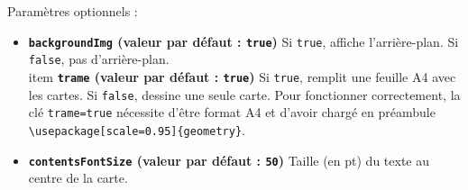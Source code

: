 \documentclass[a4paper, 12pt]{article}
\newcommand{\key}[3]{\textbf{\texttt{#1} (valeur par défaut : \texttt{#2})} #3}
\newcommand{\commande}[1]{\texttt{\textbackslash#1}}
\begin{document}
Paramètres optionnels :
\begin{itemize}
	\item \key{backgroundImg}{true}{Si \texttt{true}, affiche l'arrière-plan. Si \texttt{false}, pas d'arrière-plan.}
	\\item \key{trame}{true}{Si \texttt{true}, remplit une feuille A4 avec les cartes. Si \texttt{false}, dessine une seule carte. Pour fonctionner correctement, la clé \texttt{trame=true} nécessite d'être format A4 et d'avoir chargé en préambule \commande{usepackage[scale=0.95]\{geometry\}}}.
	\item \key{contentsFontSize}{50}{Taille (en pt) du texte au centre de la carte.}
\end{itemize}
\end{document}
